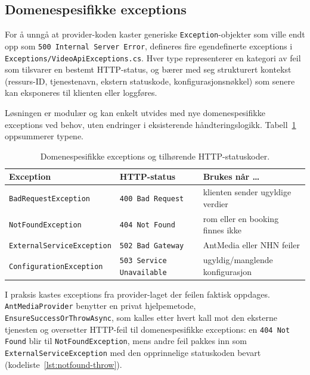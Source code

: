 \subsection{Domenespesifikke exceptions}
\label{subsec:errors-exceptions}

For å unngå at provider-koden kaster generiske \texttt{Exception}-objekter som ville endt opp som \texttt{500 Internal Server Error}, defineres fire egendefinerte exceptions i \texttt{Exceptions/VideoApiExceptions.cs}. Hver type representerer en kategori av feil som tilsvarer en bestemt HTTP-status, og bærer med seg strukturert kontekst (ressurs-ID, tjenestenavn, ekstern statuskode, konfigurasjonsnøkkel) som senere kan eksponeres til klienten eller loggføres.

Løsningen er modulær og kan enkelt utvides med nye domenespesifikke exceptions ved behov, uten endringer i eksisterende håndteringslogikk. Tabell~\ref{tab:domain-exceptions} oppsummerer typene.

\begin{table}[htbp]
\centering
\caption{Domenespesifikke exceptions og tilhørende HTTP-statuskoder.}
\label{tab:domain-exceptions}
\small
\begin{tabular}{l l l}
\toprule
\textbf{Exception} & \textbf{HTTP-status} & \textbf{Brukes når \dots} \\
\midrule
\texttt{BadRequestException}      & \texttt{400 Bad Request}          & klienten sender ugyldige verdier \\
\texttt{NotFoundException}        & \texttt{404 Not Found}            & rom eller en booking finnes ikke \\
\texttt{ExternalServiceException} & \texttt{502 Bad Gateway}          & AntMedia eller NHN feiler \\
\texttt{ConfigurationException}   & \texttt{503 Service Unavailable}  & ugyldig/manglende konfigurasjon \\
\bottomrule
\end{tabular}
\end{table}

\newpage

I praksis kastes exceptions fra provider-laget der feilen faktisk oppdages. \texttt{AntMediaProvider} benytter en privat hjelpemetode, \texttt{EnsureSuccessOrThrowAsync}, som kalles etter hvert kall mot den eksterne tjenesten og oversetter HTTP-feil til domenespesifikke exceptions: en \texttt{404 Not Found} blir til \texttt{NotFoundException}, mens andre feil pakkes inn som \texttt{ExternalServiceException} med den opprinnelige statuskoden bevart (kodeliste~\ref{lst:notfound-throw}).

